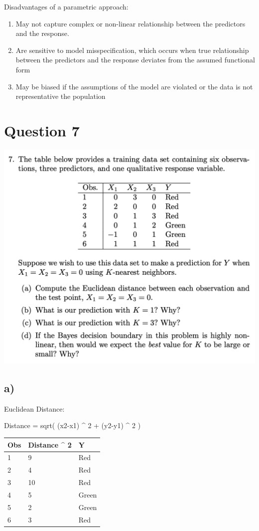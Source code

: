 \documentclass[
]{article}
\providecommand{\tightlist}{%
  \setlength{\itemsep}{0pt}\setlength{\parskip}{0pt}}
\begin{document}
Disadvantages of a parametric approach:

\begin{enumerate}
\def\labelenumi{\arabic{enumi}.}
\tightlist
\item
  May not capture complex or non-linear relationship between the
  predictors and the response.
\item
  Are sensitive to model misspecification, which occurs when true
  relationship between the predictors and the response deviates from the
  assumed functional form
\item
  May be biased if the assumptions of the model are violated or the data
  is not representative the population
\end{enumerate}

\hypertarget{question-7}{%
\section{Question 7}\label{question-7}}

\includegraphics{images/image-1787682983.png}

\hypertarget{a-4}{%
\subsection{a)}\label{a-4}}

Euclidean Distance:

Distance = sqrt( (x2-x1) \^{} 2 + (y2-y1) \^{} 2 )

\begin{longtable}[]{@{}lll@{}}
\toprule()
Obs & Distance \^{} 2 & Y \\
\midrule()
\endhead
1 & 9 & Red \\
2 & 4 & Red \\
3 & 10 & Red \\
4 & 5 & Green \\
5 & 2 & Green \\
6 & 3 & Red \\
\bottomrule()
\end{longtable}
\end{document}
